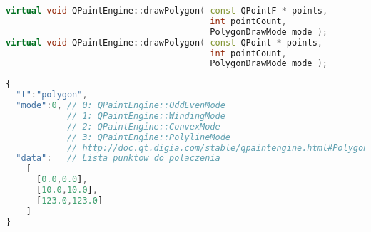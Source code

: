 \begin{lstlisting}[language=C++,numbers=none]
virtual void QPaintEngine::drawPolygon( const QPointF * points, 
                                        int pointCount, 
                                        PolygonDrawMode mode );
virtual void QPaintEngine::drawPolygon( const QPoint * points, 
                                        int pointCount, 
                                        PolygonDrawMode mode );
\end{lstlisting}
\begin{lstlisting}[language=JavaScript,numbers=none]
{
  "t":"polygon",
  "mode":0, // 0: QPaintEngine::OddEvenMode
            // 1: QPaintEngine::WindingMode
            // 2: QPaintEngine::ConvexMode
            // 3: QPaintEngine::PolylineMode	
            // http://doc.qt.digia.com/stable/qpaintengine.html#PolygonDrawMode-enum
  "data":   // Lista punktow do polaczenia
    [
      [0.0,0.0],
      [10.0,10.0],
      [123.0,123.0]
    ]
}
\end{lstlisting}
